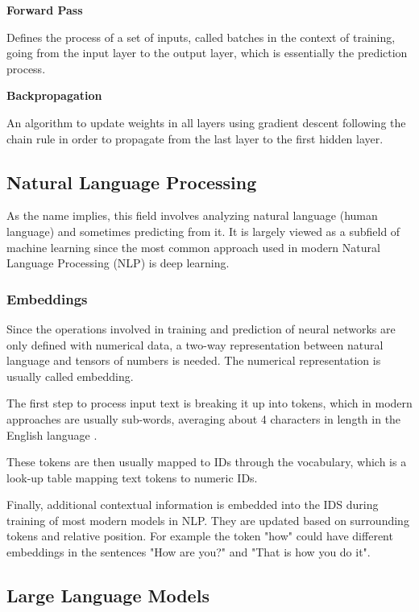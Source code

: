 \textbf{Forward Pass}

Defines the process of a set of inputs, called batches in the context of training, going from the input layer to the output layer, which is essentially the prediction process.

\textbf{Backpropagation}

An algorithm to update weights in all layers using gradient descent following the chain rule in order to propagate from the last layer to the first hidden layer.

\subsection{Natural Language Processing}

As the name implies, this field involves analyzing natural language (human language) and sometimes predicting from it. It is largely viewed as a subfield of machine learning since the most common approach used in modern Natural Language Processing (NLP) is deep learning.

\subsubsection{Embeddings}
Since the operations involved in training and prediction of neural networks are only defined with numerical data, a two-way representation between natural language and tensors of numbers is needed. The numerical representation is usually called embedding.

The first step to process input text is breaking it up into tokens, which in modern approaches are usually sub-words, averaging about 4 characters in length in the English language \cite{OpenAITokens}.

These tokens are then usually mapped to IDs through the vocabulary, which is a look-up table mapping text tokens to numeric IDs.

Finally, additional contextual information is embedded into the IDS during training of most modern models in NLP. They are updated based on surrounding tokens and relative position. For example the token "how" could have different embeddings in the sentences "How are you?" and "That is how you do it".

\subsection{Large Language Models}

